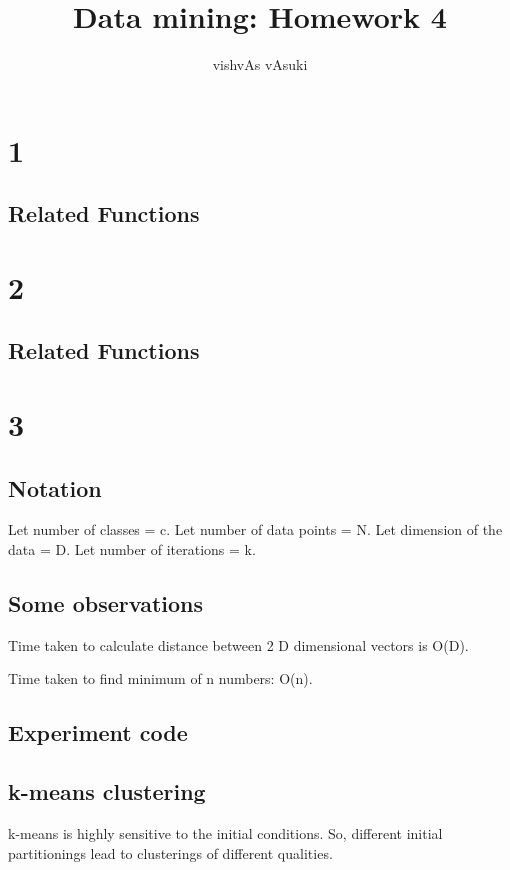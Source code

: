 \documentclass{article}
\title{Data mining: Homework 4}
\author{vishvAs vAsuki}
\begin{document}
\maketitle

\section{1}



\subsection{Related Functions}


\section{2}


\subsection{Related Functions}



\section{3}
\subsection{Notation}
Let number of classes = c. Let number of data points = N. Let dimension of the data = D. Let number of iterations = k.

\subsection{Some observations}
Time taken to calculate distance between 2 D dimensional vectors is O(D).

Time taken to find minimum of n numbers: O(n).

\subsection{Experiment code}


\subsection{k-means clustering}
k-means is highly sensitive to the initial conditions. So, different initial partitionings lead to clusterings of different qualities.
\end{document}
